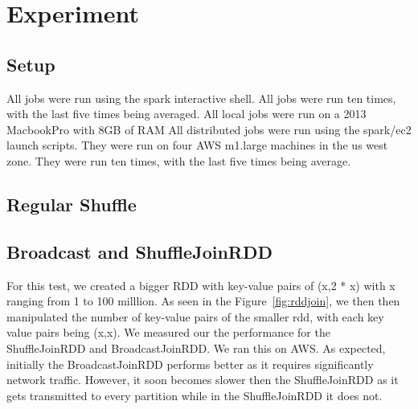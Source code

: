 \chapter{Experiment}

\section{Setup}

All jobs were run using the spark interactive shell.
All jobs were run ten times, with the last five times being averaged.
All local jobs were run on a 2013 MacbookPro with 8GB of RAM 
All distributed jobs were run using the spark/ec2 launch scripts. They were run on 
four AWS m1.large machines in the us west zone. They were run ten times, with the last five times 
being average.

\section{Regular Shuffle}


\section{Broadcast and ShuffleJoinRDD}

For this test, we created a bigger RDD with key-value pairs of (x,2 * x) with x ranging from 1 to 100 milllion.
As seen in the Figure~\ref{fig:rddjoin}, we then then manipulated the number of key-value pairs of the smaller rdd, 
with each key value pairs being (x,x). We measured our the performance for the ShuffleJoinRDD and BroadcastJoinRDD. 
We ran this on AWS. As expected, initially the BroadcastJoinRDD performs better as it requires significantly network traffic.
However, it soon becomes slower then the ShuffleJoinRDD as it gets transmitted to every partition while in the ShuffleJoinRDD it
does not.

